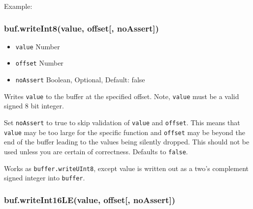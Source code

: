 Example:

\begin{Shaded}
\begin{Highlighting}[]
  \NormalTok{(}\NormalTok{);}
\NormalTok{(}\NormalTok{, }\NormalTok{);}


\NormalTok{(}\NormalTok{, }\NormalTok{);}


\end{Highlighting}
\end{Shaded}

\subsubsection{buf.writeInt8(value, offset{[},
noAssert{]})}\label{buf.writeint8value-offset-noassert}

\begin{itemize}
\itemsep1pt\parskip0pt
\item
  \texttt{value} Number
\item
  \texttt{offset} Number
\item
  \texttt{noAssert} Boolean, Optional, Default: false
\end{itemize}

Writes \texttt{value} to the buffer at the specified offset. Note,
\texttt{value} must be a valid signed 8 bit integer.

Set \texttt{noAssert} to true to skip validation of \texttt{value} and
\texttt{offset}. This means that \texttt{value} may be too large for the
specific function and \texttt{offset} may be beyond the end of the
buffer leading to the values being silently dropped. This should not be
used unless you are certain of correctness. Defaults to \texttt{false}.

Works as \texttt{buffer.writeUInt8}, except value is written out as a
two's complement signed integer into \texttt{buffer}.

\subsubsection{buf.writeInt16LE(value, offset{[},
noAssert{]})}\label{buf.writeint16levalue-offset-noassert}

